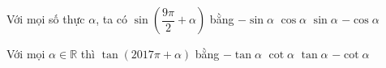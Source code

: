 \begin{ex}%
	Với mọi số thực $\alpha $, ta có $\sin \left(\dfrac{9\pi}{2}+\alpha\right)$ bằng 
	\choice 
		{$-\sin \alpha$} 
		{\True $\cos \alpha$} 
		{$\sin \alpha$} 
		 {$-\cos \alpha$}
\end{ex}

\begin{ex}%
	 Với mọi $\alpha \in \mathbb{R}$ thì $\tan \left(2017\pi+\alpha\right)$ bằng
	 \choice
		{$-\tan  \alpha$}
		{$\cot \alpha$} 
		 {\True $\tan \alpha$}
		 {$-\cot \alpha$}
\end{ex}

